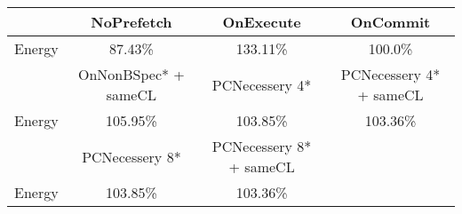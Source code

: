\begin{tabular}{ l|ccc }
 & NoPrefetch & OnExecute & OnCommit\\ \hline
Energy
 & 87.43\% & 133.11\% & 100.0\%\\ \hline
\hline
 & OnNonBSpec* + sameCL & PCNecessery 4* & PCNecessery 4* + sameCL\\ \hline
Energy
 & 105.95\% & 103.85\% & 103.36\%\\ \hline
\hline
 & PCNecessery 8* & PCNecessery 8* + sameCL&\\ \hline
Energy
 & 103.85\% & 103.36\%&\\ \hline
\end{tabular}

